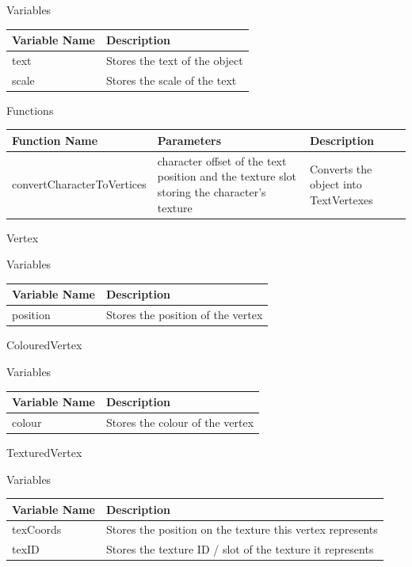\documentclass[../../Main.tex]{subfiles}
\begin{document}
    \begin{center}
        Variables
        \begin{tabular}{ | m{} | m{} | }
            \hline
            \textbf{Variable Name} & \textbf{Description} \\
            \hline
            text & Stores the text of the object \\
            \hline
            scale & Stores the scale of the text \\
            \hline
        \end{tabular}
        Functions
        \begin{tabular}{ | m{} | m{}| m{} | }
            \hline
            \textbf{Function Name} & \textbf{Parameters} & \textbf{Description} \\
            \hline
            convertCharacterToVertices & character offset of the text position and the texture slot storing the character's texture & Converts the object into TextVertexes \\
            \hline
        \end{tabular}
    \end{center}
    Vertex
    \begin{center}
        Variables
        \begin{tabular}{ | m{} | m{} | }
            \hline
            \textbf{Variable Name} & \textbf{Description} \\
            \hline
            position & Stores the position of the vertex \\
            \hline
        \end{tabular}
    \end{center}
    ColouredVertex
    \begin{center}
        Variables
        \begin{tabular}{ | m{} | m{} | }
            \hline
            \textbf{Variable Name} & \textbf{Description} \\
            \hline
            colour & Stores the colour of the vertex \\
            \hline
        \end{tabular}
    \end{center}
    TexturedVertex
    \begin{center}
        Variables
        \begin{tabular}{ | m{} | m{} | }
            \hline
            \textbf{Variable Name} & \textbf{Description} \\
            \hline
            texCoords & Stores the position on the texture this vertex represents \\
            \hline
            texID & Stores the texture ID / slot of the texture it represents \\
            \hline
        \end{tabular}
    \end{center}
\end{document}
